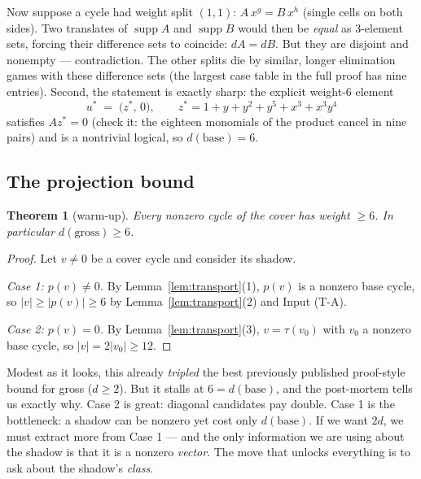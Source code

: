 \documentclass[11pt]{article}
\theoremstyle{plain}
\newtheorem{theorem}{Theorem}[section]
\theoremstyle{definition}
\theoremstyle{remark}
\newcommand{\suppop}{\operatorname{supp}}
\newcommand{\base}{\mathrm{base}}
\newcommand{\wt}[1]{\lvert #1\rvert}
\begin{document}
Now suppose a cycle had weight split $(1,1)$: $A\, x^{g} = B\, x^{h}$ (single cells on both
sides). Two translates of $\suppop A$ and $\suppop B$ would then be
\emph{equal} as 3-element sets, forcing their difference sets to coincide:
$dA = dB$. But they are disjoint and nonempty --- contradiction. The other
splits die by similar, longer elimination games with these difference sets
(the largest case table in the full proof has nine entries). Second, the
statement is exactly sharp: the explicit weight-6 element
\begin{equation}\label{eq:ustar}
u^* \;=\; \bigl(z^*,\, 0\bigr), \qquad
z^* = 1 + y + y^2 + y^5 + x^3 + x^3y^4
\end{equation}
satisfies $A z^* = 0$ (check it: the eighteen monomials of the product cancel
in nine pairs) and is a nontrivial logical, so $d(\base) = 6$.

\subsection{The projection bound}

\begin{theorem}[warm-up]\label{thm:warmup}
Every nonzero cycle of the cover has weight $\geq 6$. In particular
$d(\mathrm{gross}) \geq 6$.
\end{theorem}

\begin{proof}
Let $v \neq 0$ be a cover cycle and consider its shadow.

\emph{Case 1: $p(v) \neq 0$.} By Lemma~\ref{lem:transport}(1), $p(v)$ is a
nonzero base cycle, so $\wt{v} \geq \wt{p(v)} \geq 6$ by
Lemma~\ref{lem:transport}(2) and Input (T-A).

\emph{Case 2: $p(v) = 0$.} By Lemma~\ref{lem:transport}(3), $v = \tau(v_0)$
with $v_0$ a nonzero base cycle, so $\wt{v} = 2\wt{v_0} \geq 12$.
\end{proof}

Modest as it looks, this already \emph{tripled} the best previously published
proof-style bound for gross ($d \geq 2$). But it stalls at $6 = d(\base)$, and
the post-mortem tells us exactly why. Case 2 is great: diagonal candidates pay
double. Case 1 is the bottleneck: a shadow can be nonzero yet cost only
$d(\base)$. If we want $2d$, we must extract more from Case 1 --- and the only
information we are using about the shadow is that it is a nonzero
\emph{vector}. The move that unlocks everything is to ask about the shadow's
\emph{class}.
\end{document}
